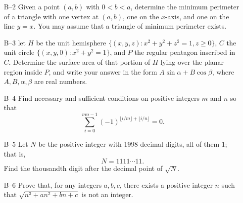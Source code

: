 \documentclass[amssymb,twocolumn,pra,10pt,aps]{revtex4-1}
\begin{document}
\begin{itemize}
\item[B--2]
Given a point $(a,b)$ with $0<b<a$, determine the minimum perimeter of a
triangle with one vertex at $(a,b)$, one on the $x$-axis, and one on the
line $y=x$.  You may assume that a triangle of minimum perimeter exists.

\item[B--3]
let $H$ be the unit hemisphere $\{(x,y,z):x^2+y^2+z^2=1,z\geq 0\}$, $C$
the unit circle $\{(x,y,0):x^2+y^2=1\}$, and $P$ the regular pentagon
inscribed in $C$.  Determine the surface area of that portion of $H$ lying
over the planar region inside $P$, and write your answer in the form
$A \sin\alpha + B \cos\beta$, where $A,B,\alpha,\beta$ are real numbers.

\item[B--4]
Find necessary and sufficient conditions on positive integers $m$ and $n$
so that
\[\sum_{i=0}^{mn-1} (-1)^{\lfloor i/m \rfloor +\lfloor i/n\rfloor}=0.\]

\item[B--5]
Let $N$ be the positive integer with 1998 decimal digits, all of them 1;
that is,
\[N=1111\cdots 11.\]
Find the thousandth digit after the decimal point of $\sqrt N$.

\item[B--6]
Prove that, for any integers $a, b, c$, there exists a positive integer
$n$ such that $\sqrt{n^3+an^2+bn+c}$ is not an integer.

\end{itemize}
\end{document}
